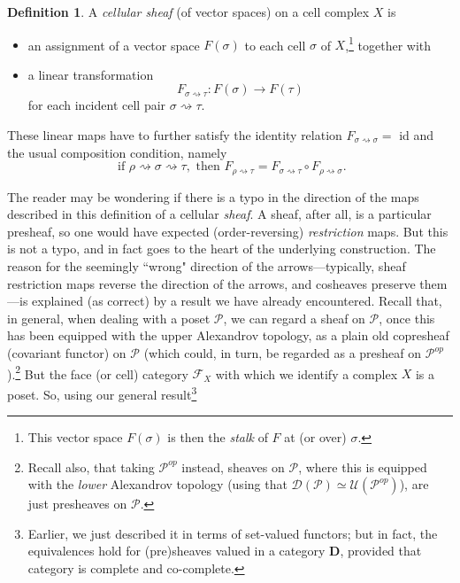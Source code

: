 \documentclass[11pt]{book}
\theoremstyle{definition}
\theoremstyle{definition}
\newtheorem{definition}{Definition}[section]
\theoremstyle{definition}
\theoremstyle{theorem}
\theoremstyle{definition}
\begin{document}
	\begin{definition}
		A \textit{cellular sheaf} (of vector spaces) on a cell complex $X$ is 
		\begin{itemize}
			\item an assignment of a vector space $F(\sigma)$ to each cell $\sigma$ of $X$,\footnote{This vector space $F(\sigma)$ is then the \textit{stalk} of $F$ at (or over) $\sigma$.} together with 
			\item a linear transformation 
			\begin{equation*} 
			F_{\sigma \rightsquigarrow \tau}: F(\sigma) \rightarrow F(\tau)
			\end{equation*} for each incident cell pair $\sigma \rightsquigarrow \tau$. 
		\end{itemize}
		These linear maps have to further satisfy the identity relation $F_{\sigma \rightsquigarrow \sigma} = $ id and the usual composition condition, namely
		\begin{equation*}
		\text{ if } \rho \rightsquigarrow \sigma \rightsquigarrow \tau , \text{ then } F_{\rho \rightsquigarrow \tau} = F_{\sigma \rightsquigarrow \tau} \circ F_{\rho \rightsquigarrow \sigma}. 
		\end{equation*}
	\end{definition} 
The reader may be wondering if there is a typo in the direction of the maps described in this definition of a cellular \textit{sheaf}. A sheaf, after all, is a particular presheaf, so one would have expected (order-reversing) \textit{restriction} maps. But this is not a typo, and in fact goes to the heart of the underlying construction. The reason for the seemingly ``wrong" direction of the arrows---typically, sheaf restriction maps reverse the direction of the arrows, and cosheaves preserve them---is explained (as correct) by a result we have already encountered. Recall that, in general, when dealing with a poset $\mathcal{P}$, we can regard a sheaf on $\mathcal{P}$, once this has been equipped with the upper Alexandrov topology, as a plain old copresheaf (covariant functor) on $\mathcal{P}$ (which could, in turn, be regarded as a presheaf on $\mathcal{P}^{op}$).\footnote{Recall also, that taking $\mathcal{P}^{op}$ instead, sheaves on $\mathcal{P}$, where this is equipped with the \textit{lower} Alexandrov topology (using that $\mathcal{D}(\mathcal{P}) \simeq \mathcal{U}(\mathcal{P}^{op})$), are just presheaves on $\mathcal{P}$.} But the face (or cell) category $\mathcal{F}_{X}$ with which we identify a complex $X$ is a poset. So, using our general result\footnote{Earlier, we just described it in terms of set-valued functors; but in fact, the equivalences hold for (pre)sheaves valued in a category $\textbf{D}$, provided that category is complete and co-complete.} 
\end{document}

